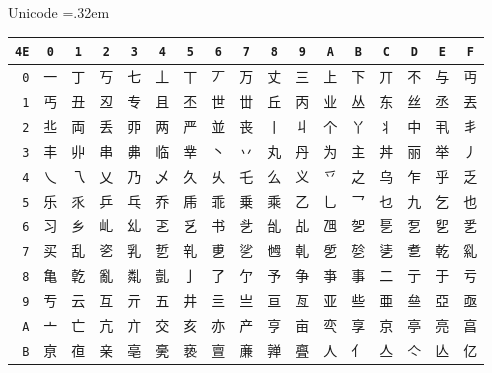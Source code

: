 \documentclass{beamer}
\begin{document}
\begin{frame}[fragile]{Unicode}
\begingroup\def\.#1{\texttt{\color{gray}\tiny#1}}%
\tabcolsep=.32em
\begin{tabular}{r|cccccccccccccccc}
\texttt{\color{gray}\footnotesize 4E} &
  \.0 & \.1 & \.2 & \.3 & \.4 & \.5 & \.6 & \.7 &
  \.8 & \.9 & \.A & \.B & \.C & \.D & \.E & \.F \\
\hline
\.0 & 一 & 丁 & 丂 & 七 & 丄 & 丅 & 丆 & 万 & 丈 & 三 & 上 & 下 & 丌 & 不 & 与 & 丏 \\
\.1 & 丐 & 丑 & 丒 & 专 & 且 & 丕 & 世 & 丗 & 丘 & 丙 & 业 & 丛 & 东 & 丝 & 丞 & 丟 \\
\.2 & 丠 & 両 & 丢 & 丣 & 两 & 严 & 並 & 丧 & 丨 & 丩 & 个 & 丫 & 丬 & 中 & 丮 & 丯 \\
\.3 & 丰 & 丱 & 串 & 丳 & 临 & 丵 & 丶 & 丷 & 丸 & 丹 & 为 & 主 & 丼 & 丽 & 举 & 丿 \\
\.4 & 乀 & 乁 & 乂 & 乃 & 乄 & 久 & 乆 & 乇 & 么 & 义 & 乊 & 之 & 乌 & 乍 & 乎 & 乏 \\
\.5 & 乐 & 乑 & 乒 & 乓 & 乔 & 乕 & 乖 & 乗 & 乘 & 乙 & 乚 & 乛 & 乜 & 九 & 乞 & 也 \\
\.6 & 习 & 乡 & 乢 & 乣 & 乤 & 乥 & 书 & 乧 & 乨 & 乩 & 乪 & 乫 & 乬 & 乭 & 乮 & 乯 \\
\.7 & 买 & 乱 & 乲 & 乳 & 乴 & 乵 & 乶 & 乷 & 乸 & 乹 & 乺 & 乻 & 乼 & 乽 & 乾 & 乿 \\
\.8 & 亀 & 亁 & 亂 & 亃 & 亄 & 亅 & 了 & 亇 & 予 & 争 & 亊 & 事 & 二 & 亍 & 于 & 亏 \\
\.9 & 亐 & 云 & 互 & 亓 & 五 & 井 & 亖 & 亗 & 亘 & 亙 & 亚 & 些 & 亜 & 亝 & 亞 & 亟 \\
\.A & 亠 & 亡 & 亢 & 亣 & 交 & 亥 & 亦 & 产 & 亨 & 亩 & 亪 & 享 & 京 & 亭 & 亮 & 亯 \\
\.B & 亰 & 亱 & 亲 & 亳 & 亴 & 亵 & 亶 & 亷 & 亸 & 亹 & 人 & 亻 & 亼 & 亽 & 亾 & 亿  
\end{tabular}
\endgroup
\end{frame}

\end{document}
